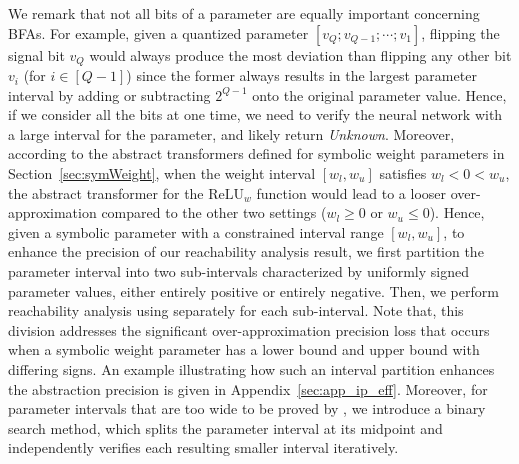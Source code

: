 We remark that not all bits of a parameter are equally important concerning BFAs. 
For example, given a quantized parameter $[v_Q;v_{Q-1};\cdots;v_1]$, flipping the signal bit $v_Q$ would always produce the most deviation than flipping any other bit $v_i$ (for $i\in[Q-1]$) since the former always results in the largest parameter interval by adding or subtracting $2^{Q-1}$ onto the original parameter value. Hence, if we consider all the bits at one time, we need to verify the neural network with a large interval for the parameter, and likely return \emph{Unknown}. 
Moreover, according to the abstract transformers defined for symbolic weight parameters in Section~\ref{sec:symWeight}, when the weight interval $[w_l,w_u]$ satisfies $w_l<0<w_u$, the abstract transformer for the $\text{ReLU}_w$ function would lead to a looser over-approximation compared to the other two settings ($w_l\ge 0$ or $w_u\le 0$).  
Hence, given a symbolic parameter with a constrained interval range $[w_l,w_u]$, to enhance the precision of our reachability analysis result, we first partition the parameter interval into two sub-intervals characterized by uniformly signed parameter values, either entirely positive or entirely negative. Then, we perform reachability analysis using \symPoly separately for each sub-interval. Note that, this division addresses the significant over-approximation precision loss that occurs when a symbolic weight parameter has a lower bound and upper bound with differing signs. 
An example illustrating how such an interval partition enhances the abstraction precision is given in Appendix~\ref{sec:app_ip_eff}.
Moreover, for parameter intervals that are too wide to be proved by \symPoly, we introduce a binary search method, which splits the parameter interval at its midpoint and independently verifies each resulting smaller interval iteratively.

